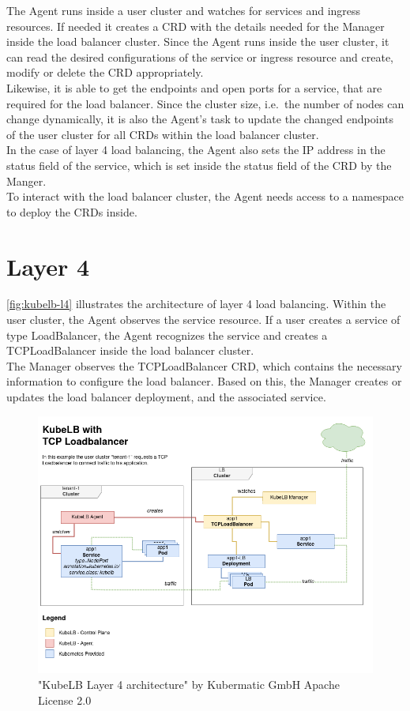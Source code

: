 The Agent runs inside a user cluster and watches for services and ingress resources.
If needed it creates a CRD with the details needed for the Manager inside the load balancer cluster.
Since the Agent runs inside the user cluster, it can read the desired configurations of the service or ingress resource and create, modify or delete the CRD appropriately.
\\
Likewise, it is able to get the endpoints and open ports for a service, that are required for the load balancer.
Since the cluster size, i.e.\ the number of nodes can change dynamically, it is also the Agent's task to update the changed endpoints of the user cluster for all CRDs within the load balancer cluster.
\\
In the case of layer 4 load balancing, the Agent also sets the IP address in the status field of the service, which is set inside the status field of the CRD by the Manger.
\\
To interact with the load balancer cluster, the Agent needs access to a namespace to deploy the CRDs inside.

\section{Layer 4}

\autoref{fig:kubelb-l4} illustrates the architecture of layer 4 load balancing.
Within the user cluster, the Agent observes the service resource.
If a user creates a service of type LoadBalancer, the Agent recognizes the service and creates a TCPLoadBalancer inside the load balancer cluster.
\\
The Manager observes the TCPLoadBalancer CRD, which contains the necessary information to configure the load balancer.
Based on this, the Manager creates or updates the load balancer deployment, and the associated service.


\begin{figure}[H]
    \centering
    \includegraphics[width=1\linewidth]{media/06/kubelb-l4}
    \caption{"KubeLB Layer 4 architecture" by Kubermatic GmbH Apache License 2.0}
    \label{fig:kubelb-l4}
\end{figure}


